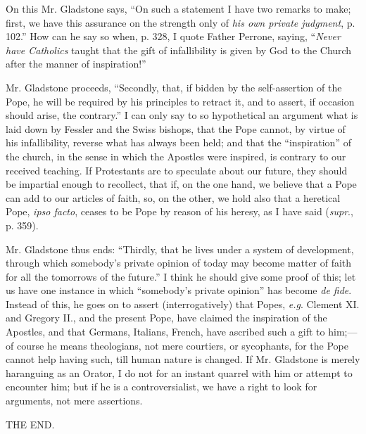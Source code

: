 On this Mr. Gladstone says, ``On such a statement I have two
remarks to make; first, we have this assurance on the strength only of \emph{his
own private judgment}, p. 102.'' How can he say so when, p. 328,
I quote Father Perrone, saying, ``\emph{Never have Catholics} taught
that the gift of infallibility is given by God to the Church after the
manner of inspiration!''

Mr. Gladstone proceeds, ``Secondly, that, if bidden by the
self-assertion of the Pope, he will be required by his principles to
retract it, and to assert, if occasion should arise, the contrary.''
I can only say to so hypothetical an argument what is laid down by
Fessler and the Swiss bishops, that the Pope cannot, by virtue of his
infallibility, reverse what has always been held; and that the
``inspiration'' of the church, in the sense in which the
Apostles were inspired, is contrary to our received teaching. If
Protestants are to speculate about our future, they should be impartial
enough to recollect, that if, on the one hand, we believe that a Pope
can add to our articles of faith, so, on the other, we hold also that a
heretical Pope, \emph{ipso facto}, ceases to be Pope by reason of his
heresy, as I have said (\emph{supr}., p. 359).

Mr. Gladstone thus ends: ``Thirdly, that he lives under a system
of development, through which somebody's private opinion of today may
become matter of faith for all the tomorrows of the future.'' I
think he should give some proof of this; let us have one instance in
which ``somebody's private opinion'' has become \emph{de fide}.
Instead of this, he goes on to assert (interrogatively) that Popes, \emph{e.g}.
Clement XI. and Gregory II., and the present Pope, have claimed the
inspiration of the Apostles, and that Germans, Italians, French, have
ascribed such a gift to him;—of course he means theologians, not mere
courtiers, or sycophants, for the Pope cannot help having such, till
human nature is changed. If Mr. Gladstone is merely haranguing as an
Orator, I do not for an instant quarrel with him or attempt to encounter
him; but if he is a controversialist, we have a right to look for
arguments, not mere assertions.

THE END.
